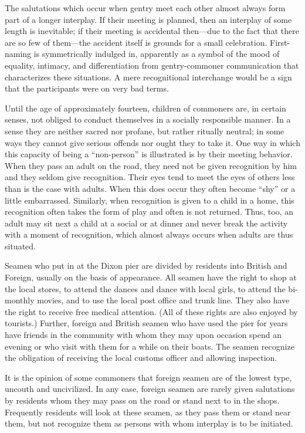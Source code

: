 \documentclass[openany,nobib]{tufte-book}
\begin{document}
The salutations which occur when gentry meet each other almost always
form part of a longer interplay. If their meeting is planned, then an
interplay of some length is inevitable; if their meeting is accidental
then---due to the fact that there are so few of them---the accident
itself is grounds for a small celebration. First-naming is symmetrically
indulged in, apparently as a symbol of the mood of equality, intimacy,
and differentiation from gentry-commoner communication that
characterizes these situations. A mere recognitional interchange would
be a sign that the participants were on very bad terms.

Until the age of approximately fourteen, children of commoners are, in
certain senses, not obliged to conduct themselves in a socially
responsible manner. In a sense they are neither sacred nor profane, but
rather ritually neutral; in some ways they cannot give serious offends
nor ought they to take it. One way in which this capacity of being a
``non-person'' is illustrated is by their meeting behavior. When they
pass an adult on the road, they need not be given recognition by him and
they seldom give recognition. Their eyes tend to meet the eyes of others
less than is the case with adults. When this does occur they often
become ``shy'' or a little embarrassed. Similarly, when recognition is
given to a child in a home, this recognition often takes the form of
play and often is not returned. Thus, too, an adult may sit next a child
at a social or at dinner and never break the activity with a moment of
recognition, which almost always occurs when adults are thus situated.

Seamen who put in at the Dixon pier are divided by residents into
British and Foreign, usually on the basis of appearance. All seamen have
the right to shop at the local stores, to attend the dances and dance
with local girls, to attend the bi-monthly movies, and to use the local
post office and trunk line. They also have the right to receive free
medical attention. (All of these rights are also enjoyed by tourists.)
Further, foreign and British seamen who have used the pier for years
have friends in the community with whom they may upon occasion spend an
evening or who visit with them for a while on their boats. The seamen
recognize the obligation of receiving the local customs officer and
allowing inspection.

It is the opinion of some commoners that foreign seamen are of the
lowest type, uncouth and uncivilized. In any case, foreign seamen are
rarely given salutations by residents whom they may pass on the road or
stand next to in the shops. Frequently residents will look at these
seamen, as they pass them or stand near them, but not recognize them as
persons with whom interplay is to be initiated.
\end{document}
